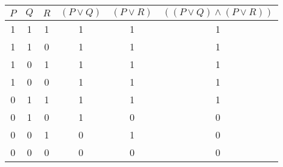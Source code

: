 \begin{tabular}{|c|c|c||c|c|c|}
\hline
$ P $ & $ Q $ & $ R $ & $ (P \vee Q) $ & $ (P \vee R) $ & $ ((P \vee Q) \wedge (P \vee R)) $ \\
\hline
1 & 1 & 1 & 1 & 1 & 1 \\
1 & 1 & 0 & 1 & 1 & 1 \\
1 & 0 & 1 & 1 & 1 & 1 \\
1 & 0 & 0 & 1 & 1 & 1 \\
0 & 1 & 1 & 1 & 1 & 1 \\
0 & 1 & 0 & 1 & 0 & 0 \\
0 & 0 & 1 & 0 & 1 & 0 \\
0 & 0 & 0 & 0 & 0 & 0 \\
\hline
\end{tabular}
